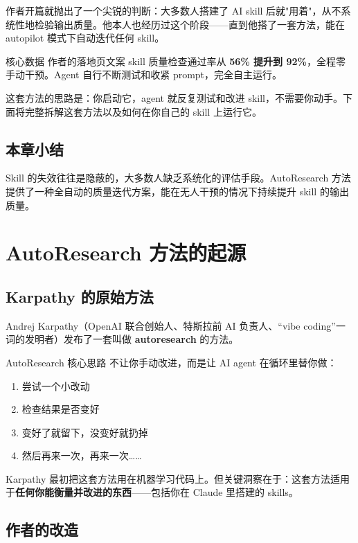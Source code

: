 \documentclass[a4paper]{article}
\begin{document}
作者开篇就抛出了一个尖锐的判断：大多数人搭建了 AI skill 后就"用着"，从不系统性地检验输出质量。他本人也经历过这个阶段——直到他搭了一套方法，能在 autopilot 模式下自动迭代任何 skill。

\begin{importantbox}{核心数据}
作者的落地页文案 skill 质量检查通过率从 \textbf{56\% 提升到 92\%}，全程零手动干预。Agent 自行不断测试和收紧 prompt，完全自主运行。
\end{importantbox}

这套方法的思路是：你启动它，agent 就反复测试和改进 skill，不需要你动手。下面将完整拆解这套方法以及如何在你自己的 skill 上运行它。

\subsection{本章小结}

Skill 的失效往往是隐蔽的，大多数人缺乏系统化的评估手段。AutoResearch 方法提供了一种全自动的质量迭代方案，能在无人干预的情况下持续提升 skill 的输出质量。

\section{AutoResearch 方法的起源}

\subsection{Karpathy 的原始方法}

Andrej Karpathy（OpenAI 联合创始人、特斯拉前 AI 负责人、``vibe coding''一词的发明者）发布了一套叫做 \textbf{autoresearch} 的方法。

\begin{importantbox}{AutoResearch 核心思路}
不让你手动改进，而是让 AI agent 在循环里替你做：
\begin{enumerate}
    \item 尝试一个小改动
    \item 检查结果是否变好
    \item 变好了就留下，没变好就扔掉
    \item 然后再来一次，再来一次……
\end{enumerate}
\end{importantbox}

Karpathy 最初把这套方法用在机器学习代码上。但关键洞察在于：这套方法适用于\textbf{任何你能衡量并改进的东西}——包括你在 Claude 里搭建的 skills。

\subsection{作者的改造}
\end{document}
